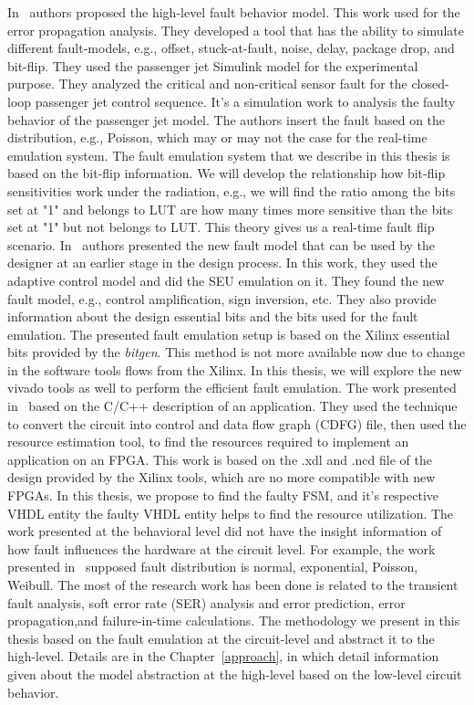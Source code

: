 In~\citep{janschek2017errorsim} authors proposed the high-level fault behavior model. This work used for the error propagation analysis. They developed a tool that has the ability to simulate different fault-models, e.g., offset, stuck-at-fault, noise, delay, package drop, and bit-flip. They used the passenger jet Simulink model for the experimental purpose. They analyzed the critical and non-critical sensor fault for the closed-loop passenger jet control sequence. It's  a simulation work to analysis the faulty behavior of the passenger jet model.  The authors insert the fault based on the distribution, e.g., Poisson, which may or may not the case for the real-time emulation system. The fault emulation system that we describe in this thesis is based on the bit-flip information. We will develop the relationship how bit-flip sensitivities work under the radiation,  e.g., we will find the ratio among the bits set at "1" and belongs to LUT are how many times more sensitive than the bits set at "1" but not belongs to LUT. This theory gives us a real-time fault flip scenario.
In~\citep{hobeika2013flight} authors presented the new fault model that can be used by the designer at an earlier stage in the design process. In this work, they used the adaptive control model and did the SEU emulation on it. They found the new fault model, e.g., control amplification, sign inversion, etc. They also provide information about the design essential bits and the bits used for the fault emulation. The presented fault emulation setup is based on the Xilinx essential bits provided by the \textit{bitgen}. This method is not more available now due to change in the software tools flows from the Xilinx. In this thesis, we will explore the new vivado tools as well to perform the efficient fault emulation. 
The work presented in~\citep{thibeault2013library} based on the C/C++ description of an application. They used the technique to convert the circuit into control and data flow graph (CDFG) file, then used the resource estimation tool, to find the resources required to implement an application on an FPGA. This work is based on the .xdl and .ncd file of the design provided by the Xilinx tools, which are no more compatible with new FPGAs. In this thesis, we propose to find the faulty FSM, and it's respective VHDL entity the faulty VHDL entity helps to find the resource utilization. 
The work presented at the behavioral level did not have the insight information of how fault influences the hardware at the circuit level. For example, the work presented in~\citep{janschek2017errorsim} supposed fault distribution is normal, exponential, Poisson, Weibull. The most of the research work has been done is related to the transient fault analysis, soft error rate (SER) analysis and error prediction, error propagation,and failure-in-time calculations.
The methodology we present in this thesis based on the fault emulation at the circuit-level and abstract it to the high-level. Details are in the Chapter~\ref{approach}, in which detail information given about the model abstraction at the high-level based on the low-level circuit behavior.
